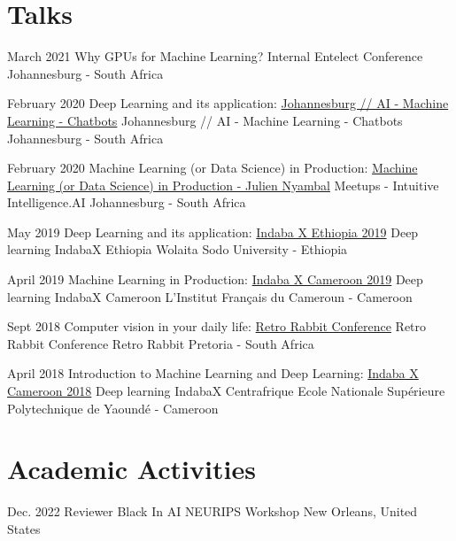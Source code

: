 \documentclass[11pt, letterpaper]{moderncv}        %
\begin{document}
\vspace{1mm}


\section{Talks}

\cventry
{March 2021}
{Why GPUs for Machine Learning?}
{Internal Entelect Conference}
{Johannesburg - South Africa}
{}
{}

\cventry
{February 2020}
{Deep Learning and its application: \href{https://www.meetup.com/Johannesburg-Artificial-Intelligence-Meetup/events/268234198/}{Johannesburg // AI - Machine Learning - Chatbots}}
{Johannesburg // AI - Machine Learning - Chatbots}
{Johannesburg - South Africa}
{}
{}

\cventry
{February 2020}
{Machine Learning (or Data Science) in Production: \href{https://www.frenchtechsa.com/projects/machine-learning-(or-data-science)-in-production}{Machine Learning (or Data Science) in Production - Julien Nyambal}}
{Meetups - Intuitive Intelligence.AI}
{Johannesburg - South Africa}
{}
{}

\cventry
{May 2019}
{Deep Learning and its application: \href{https://sites.google.com/view/indabaxethiopia2019/speakers?authuser=0}{Indaba X Ethiopia 2019}}
{Deep learning IndabaX Ethiopia}
{Wolaita Sodo University - Ethiopia}
{}
{}

\cventry
{April 2019}
{Machine Learning in Production:    \href{https://indabaxcameroon.github.io}{Indaba X Cameroon 2019}}
{Deep learning IndabaX Cameroon}
{L'Institut Français du Cameroun - Cameroon}
{}
{}


\cventry
{Sept 2018}
{Computer vision in your daily life: \href{https://www.youtube.com/watch?v=0Z--tiJ3FyE}
	{Retro Rabbit Conference}}
{Retro Rabbit Conference}
{Retro Rabbit Pretoria - South Africa}
{}
{}

\cventry
{April 2018}
{Introduction to Machine Learning and Deep Learning: \href{http://www.deeplearningindaba.com/indabax-centrafrique.html}{Indaba X Cameroon 2018}}
{Deep learning IndabaX Centrafrique}
{Ecole Nationale Supérieure Polytechnique de Yaoundé - Cameroon}
{}
{}
	
\vspace{9mm}	

\section{Academic Activities}	

\cventry
{Dec. 2022}
{Reviewer Black In AI}
{NEURIPS Workshop}
{New Orleans, United States}
{}
{}
\end{document}

